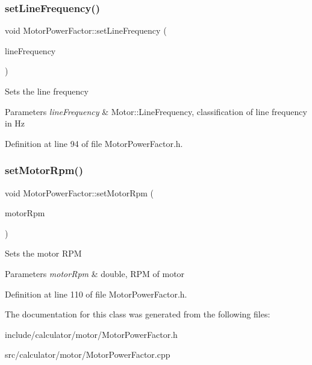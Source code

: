 \subsubsection{\texorpdfstring{set\+Line\+Frequency()}{setLineFrequency()}}
{\footnotesize\ttfamily void Motor\+Power\+Factor\+::set\+Line\+Frequency (\begin{DoxyParamCaption}\item[{Motor\+::\+Line\+Frequency}]{line\+Frequency }\end{DoxyParamCaption})\hspace{0.3cm}{\ttfamily [inline]}}

Sets the line frequency 
\begin{DoxyParams}{Parameters}
{\em line\+Frequency} & Motor\+::\+Line\+Frequency, classification of line frequency in Hz \\
\hline
\end{DoxyParams}


Definition at line 94 of file Motor\+Power\+Factor.\+h.

\mbox{\label{class_motor_power_factor_a4154bf52c6c9c9e5fb2f0985d7ae3531}} 
\subsubsection{\texorpdfstring{set\+Motor\+Rpm()}{setMotorRpm()}}
{\footnotesize\ttfamily void Motor\+Power\+Factor\+::set\+Motor\+Rpm (\begin{DoxyParamCaption}\item[{double}]{motor\+Rpm }\end{DoxyParamCaption})\hspace{0.3cm}{\ttfamily [inline]}}

Sets the motor R\+PM 
\begin{DoxyParams}{Parameters}
{\em motor\+Rpm} & double, R\+PM of motor \\
\hline
\end{DoxyParams}


Definition at line 110 of file Motor\+Power\+Factor.\+h.



The documentation for this class was generated from the following files\+:\begin{DoxyCompactItemize}
\item 
include/calculator/motor/Motor\+Power\+Factor.\+h\item 
src/calculator/motor/Motor\+Power\+Factor.\+cpp\end{DoxyCompactItemize}
